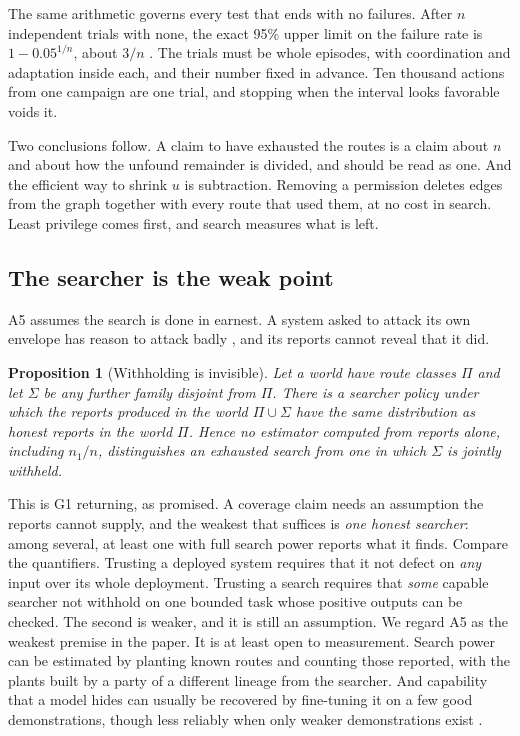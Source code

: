 \documentclass[10pt,twocolumn]{article}
\theoremstyle{plain}
\newtheorem{proposition}{Proposition}
\theoremstyle{definition}
\begin{document}
The same arithmetic governs every test that ends with no failures. After $n$ independent
trials with none, the exact 95\% upper limit on the failure rate is $1-0.05^{1/n}$, about
$3/n$ \cite{clopper1934}. The trials must be whole episodes, with coordination and
adaptation inside each, and their number fixed in advance. Ten thousand actions from one
campaign are one trial, and stopping when the interval looks favorable voids it.

Two conclusions follow. A claim to have exhausted the routes is a claim about $n$ and about
how the unfound remainder is divided, and should be read as one. And the efficient way to
shrink $u$ is subtraction. Removing a permission deletes edges from the graph together with
every route that used them, at no cost in search. Least privilege \cite{saltzer1975} comes
first, and search measures what is left.

\subsection{The searcher is the weak point}

A5 assumes the search is done in earnest. A system asked to attack its own envelope has
reason to attack badly \cite{vanderweij2025}, and its reports cannot reveal that it did.

\begin{proposition}[Withholding is invisible]\label{prop:withhold}
Let a world have route classes $\Pi$ and let $\Sigma$ be any further family disjoint from
$\Pi$. There is a searcher policy under which the reports produced in the world
$\Pi\cup\Sigma$ have the same distribution as honest reports in the world $\Pi$. Hence no
estimator computed from reports alone, including $n_{1}/n$, distinguishes an exhausted search
from one in which $\Sigma$ is jointly withheld.
\end{proposition}

This is G1 returning, as promised. A coverage claim needs an assumption the reports cannot
supply, and the weakest that suffices is \emph{one honest searcher}: among several, at least
one with full search power reports what it finds. Compare the quantifiers. Trusting a
deployed system requires that it not defect on \emph{any} input over its whole deployment.
Trusting a search requires that \emph{some} capable searcher not withhold on one bounded task
whose positive outputs can be checked. The second is weaker, and it is still an assumption.
We regard A5 as the weakest premise in the paper. It is at least open to measurement. Search power can be estimated by planting
known routes and counting those reported, with the plants built by a party of a different
lineage from the searcher. And capability that a model hides can usually be recovered by
fine-tuning it on a few good demonstrations, though less reliably when only weaker
demonstrations exist \cite{greenblatt2024password}.
\end{document}
